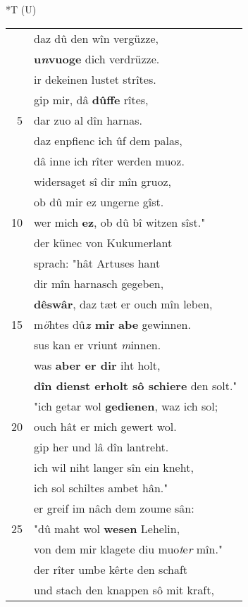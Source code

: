 \documentclass[8pt,a4paper,notitlepage]{article}
\begin{document}
\begin{table}[ht]
\begin{minipage}[t]{0.5\linewidth}
\end{minipage}
\hspace{0.5cm}
\begin{minipage}[t]{0.5\linewidth}
\small
\begin{center}*T (U)
\end{center}
\begin{tabular}{rl}
 & daz dû den wîn vergüzze,\\ 
 & \textbf{u\textit{n}vuoge} dich verdrüzze.\\ 
 & ir dekeinen lustet strîtes.\\ 
 & gip mir, dâ \textbf{dûffe} rîtes,\\ 
5 & dar zuo al dîn harnas.\\ 
 & daz enpfienc ich ûf dem palas,\\ 
 & dâ inne ich rîter werden muoz.\\ 
 & widersaget sî dir mîn gruoz,\\ 
 & ob dû mir ez ungerne gîst.\\ 
10 & wer mich \textbf{ez}, ob dû bî witzen sîst."\\ 
 & der künec von Kukumerlant\\ 
 & sprach: "hât Artuses hant\\ 
 & dir mîn harnasch gegeben,\\ 
 & \textbf{dêswâr}, daz tæt er ouch mîn leben,\\ 
15 & m\textit{ö}htes dû\textbf{\textit{z} mir} \textbf{abe} gewinnen.\\ 
 & sus kan er vriunt \textit{m}innen.\\ 
 & was \textbf{aber er dir} iht holt,\\ 
 & \textbf{dîn dienst erholt sô schiere} den solt."\\ 
 & "ich getar wol \textbf{gedienen}, waz ich sol;\\ 
20 & ouch hât er mich gewert wol.\\ 
 & gip her und lâ dîn lantreht.\\ 
 & ich wil niht langer sîn ein kneht,\\ 
 & ich sol schiltes ambet hân."\\ 
 & er greif im nâch dem zoume sân:\\ 
25 & "dû maht wol \textbf{wesen} Lehelin,\\ 
 & von dem mir klagete diu muo\textit{t}e\textit{r} mîn."\\ 
 & der rîter umbe kêrte den schaft\\ 
 & und stach den knappen sô mit kraft,\\ 

\end{tabular}
\end{minipage}
\end{table}
\end{document}
